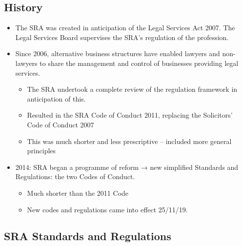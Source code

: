 \documentclass[
]{article}
\providecommand{\tightlist}{%
  \setlength{\itemsep}{0pt}\setlength{\parskip}{0pt}}
\begin{document}
\hypertarget{history}{%
\subsection{History}\label{history}}

\begin{itemize}
\tightlist
\item
  The SRA was created in anticipation of the Legal Services Act 2007.
  The Legal Services Board supervises the SRA's regulation of the
  profession.
\item
  Since 2006, alternative business structures have enabled lawyers and
  non-lawyers to share the management and control of businesses
  providing legal services.

  \begin{itemize}
  \tightlist
  \item
    The SRA undertook a complete review of the regulation framework in
    anticipation of this.
  \item
    Resulted in the SRA Code of Conduct 2011, replacing the Solicitors'
    Code of Conduct 2007
  \item
    This was much shorter and less prescriptive -- included more general
    principles
  \end{itemize}
\item
  2014: SRA began a programme of reform → new simplified Standards and
  Regulations: the two Codes of Conduct.

  \begin{itemize}
  \tightlist
  \item
    Much shorter than the 2011 Code
  \item
    New codes and regulations came into effect 25/11/19.
  \end{itemize}
\end{itemize}

\hypertarget{sra-standards-and-regulations}{%
\subsection{SRA Standards and
Regulations}\label{sra-standards-and-regulations}}
\end{document}
